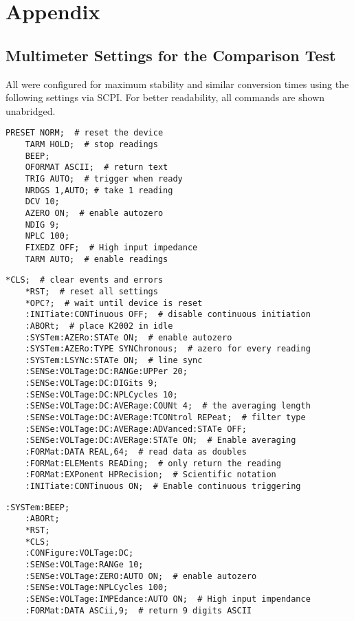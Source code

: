 \chapter{Appendix}
\section{Multimeter Settings for the Comparison Test}
\label{appendix:dmm_test}
All were configured for maximum stability and similar conversion times using the following settings via SCPI. For better readability, all commands are shown unabridged.

\begin{lstlisting}[title=HP 3458A]
    PRESET NORM;  # reset the device
    TARM HOLD;  # stop readings
    BEEP;
    OFORMAT ASCII;  # return text
    TRIG AUTO;  # trigger when ready
    NRDGS 1,AUTO; # take 1 reading
    DCV 10;
    AZERO ON;  # enable autozero
    NDIG 9;
    NPLC 100;
    FIXEDZ OFF;  # High input impedance
    TARM AUTO;  # enable readings
\end{lstlisting}

\begin{lstlisting}[title=Keithley Model 2002]
    *CLS;  # clear events and errors
    *RST;  # reset all settings
    *OPC?;  # wait until device is reset
    :INITiate:CONTinuous OFF;  # disable continuous initiation
    :ABORt;  # place K2002 in idle
    :SYSTem:AZERo:STATe ON;  # enable autozero
    :SYSTem:AZERo:TYPE SYNChronous;  # azero for every reading
    :SYSTem:LSYNc:STATe ON;  # line sync
    :SENSe:VOLTage:DC:RANGe:UPPer 20;
    :SENSe:VOLTage:DC:DIGits 9;
    :SENSe:VOLTage:DC:NPLCycles 10;
    :SENSe:VOLTage:DC:AVERage:COUNt 4;  # the averaging length
    :SENSe:VOLTage:DC:AVERage:TCONtrol REPeat;  # filter type
    :SENSe:VOLTage:DC:AVERage:ADVanced:STATe OFF;
    :SENSe:VOLTage:DC:AVERage:STATe ON;  # Enable averaging
    :FORMat:DATA REAL,64;  # read data as doubles
    :FORMat:ELEMents READing;  # only return the reading
    :FORMat:EXPonent HPRecision;  # Scientific notation
    :INITiate:CONTinuous ON;  # Enable continuous triggering
\end{lstlisting}

\begin{lstlisting}[title=Keysight 34470A]
    :SYSTem:BEEP;
    :ABORt;
    *RST;
    *CLS;
    :CONFigure:VOLTage:DC;
    :SENSe:VOLTage:RANGe 10;
    :SENSe:VOLTage:ZERO:AUTO ON;  # enable autozero
    :SENSe:VOLTage:NPLCycles 100;
    :SENSe:VOLTage:IMPEdance:AUTO ON;  # High input impendance
    :FORMat:DATA ASCii,9;  # return 9 digits ASCII
\end{lstlisting}

